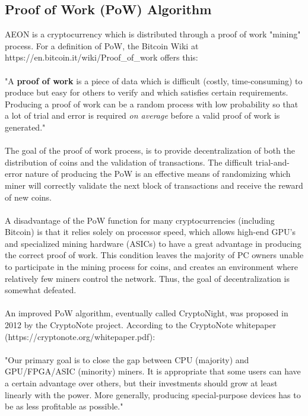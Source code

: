 \subsection{Proof of Work (PoW) Algorithm}
\label{secPoW}
AEON is a cryptocurrency which is distributed through a proof of work "mining" process.  For a definition of PoW, the Bitcoin Wiki at https://en.bitcoin.it/wiki/Proof\_of\_work offers this:\\
\\
"A \textbf{proof of work} is a piece of data which is difficult (costly, time-consuming) to produce but easy for others to verify and which satisfies certain requirements. Producing a proof of work can be a random process with low probability so that a lot of trial and error is required \textit{on average} before a valid proof of work is generated."\\
\\
The goal of the proof of work process, is to provide decentralization of both the distribution of coins and the validation of transactions. The difficult trial-and-error nature of producing the PoW is an effective means of randomizing which miner will correctly validate the next block of transactions and receive the reward of new coins.\\
\\
A disadvantage of the PoW function for many cryptocurrencies (including Bitcoin) is that it relies solely on processor speed, which allows high-end GPU's and specialized mining hardware (ASICs) to have a great advantage in producing the correct proof of work. This condition leaves the majority of PC owners unable to participate in the mining process for coins, and creates an environment where relatively few miners control the network.  Thus, the goal of decentralization is somewhat defeated.\\
\\
An improved PoW algorithm, eventually called CryptoNight, was proposed in 2012 by the CryptoNote project. According to the CryptoNote whitepaper (https://cryptonote.org/whitepaper.pdf):\\
\\
"Our primary goal is to close the gap between CPU (majority) and GPU/FPGA/ASIC (minority) miners. It is appropriate that some users can have a certain advantage over others, but their investments should grow at least linearly with the power. More generally, producing special-purpose devices has to be as less profitable as possible."\\
\\
